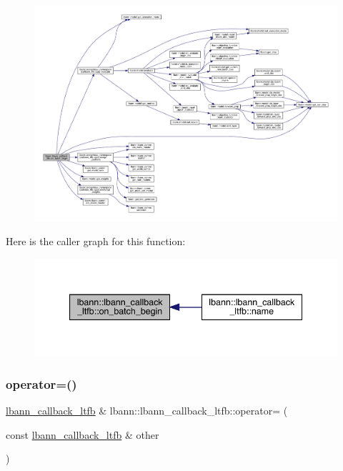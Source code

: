 \begin{figure}[H]
\begin{center}
\leavevmode
\includegraphics[width=350pt]{classlbann_1_1lbann__callback__ltfb_a7d2d1682c4a6a6b7e8ea1e3f4bf33c84_cgraph}
\end{center}
\end{figure}
Here is the caller graph for this function\+:\nopagebreak
\begin{figure}[H]
\begin{center}
\leavevmode
\includegraphics[width=340pt]{classlbann_1_1lbann__callback__ltfb_a7d2d1682c4a6a6b7e8ea1e3f4bf33c84_icgraph}
\end{center}
\end{figure}
\mbox{\label{classlbann_1_1lbann__callback__ltfb_a19467cc32f7a1960ec6d62ca1c0cb6b8}} 
\subsubsection{\texorpdfstring{operator=()}{operator=()}}
{\footnotesize\ttfamily \hyperlink{classlbann_1_1lbann__callback__ltfb}{lbann\+\_\+callback\+\_\+ltfb} \& lbann\+::lbann\+\_\+callback\+\_\+ltfb\+::operator= (\begin{DoxyParamCaption}\item[{const \hyperlink{classlbann_1_1lbann__callback__ltfb}{lbann\+\_\+callback\+\_\+ltfb} \&}]{other }\end{DoxyParamCaption})}



